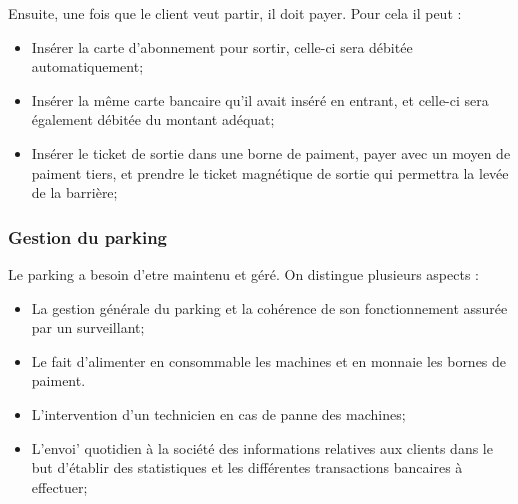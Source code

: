 \documentclass[a4paper]{article}
\begin{document}
Ensuite, une fois que le client veut partir, il doit payer. Pour cela il peut :
\begin{itemize}
		\item Ins\'erer la carte d'abonnement pour sortir, celle-ci sera d\'ebit\'ee automatiquement;
		\item Ins\'erer la m\^eme carte bancaire qu'il avait ins\'er\'e en entrant, et celle-ci sera \'egalement d\'ebit\'ee du montant ad\'equat;
		\item Ins\'erer le ticket de sortie dans une borne de paiment, payer avec un moyen de paiment tiers, et prendre le ticket magn\'etique de sortie qui permettra la lev\'ee de la barri\`ere;
\end{itemize}

\subsubsection{Gestion du parking}
Le parking a besoin d'etre maintenu et g\'er\'e. On distingue plusieurs aspects :
\begin{itemize}
		\item La gestion g\'en\'erale du parking et la coh\'erence de son fonctionnement assur\'ee par un surveillant;
		\item Le fait d'alimenter en consommable les machines et en monnaie les bornes de paiment.
		\item L'intervention d'un technicien en cas de panne des machines;
		\item L'envoi' quotidien \`a la soci\'et\'e des informations relatives aux clients dans le but d'\'etablir des statistiques et les diff\'erentes transactions bancaires \`a effectuer;
\end{itemize}
\end{document}
